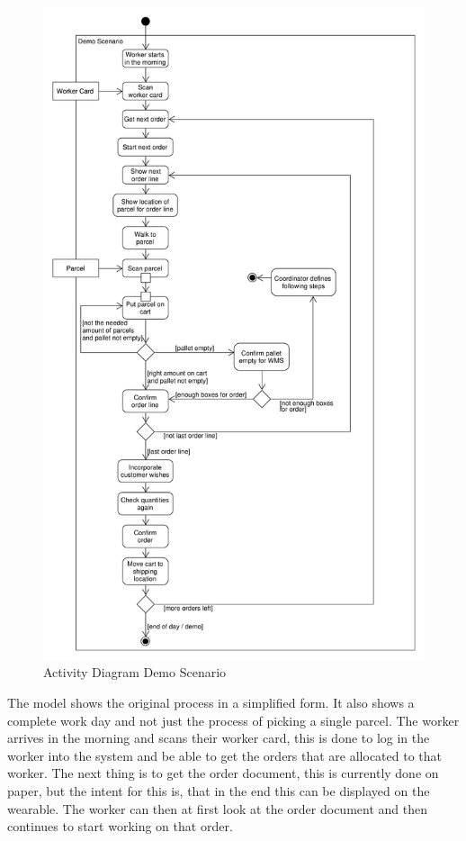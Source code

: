 \begin{figure}[htbp]
	\begin{center}
	\includegraphics[height=\textheight]{images/activityDiagram_demoScenarioNoExceptions}
	\end{center}
	\caption{Activity Diagram Demo Scenario}
	\label{fig:activityDemoScenario}
\end{figure}

\clearpage

The model shows the original process in a simplified form. It also shows a complete work day and not just the process of picking a single parcel. The worker arrives in the morning and scans their worker card, this is done to log in the worker into the system and be able to get the orders that are allocated to that worker. The next thing is to get the order document, this is currently done on paper, but the intent for this is, that in the end this can be displayed on the wearable. The worker can then at first look at the order document and then continues to start working on that order. 

